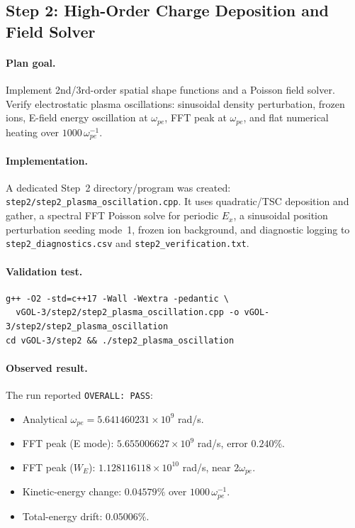\documentclass[11pt,a4paper]{article}
\begin{document}
\subsection{Step 2: High-Order Charge Deposition and Field Solver}

\paragraph{Plan goal.}
Implement 2nd/3rd-order spatial shape functions and a Poisson field solver. Verify electrostatic plasma oscillations: sinusoidal density perturbation, frozen ions, E-field energy oscillation at $\omega_{pe}$, FFT peak at $\omega_{pe}$, and flat numerical heating over $1000\,\omega_{pe}^{-1}$.

\paragraph{Implementation.}
A dedicated Step~2 directory/program was created: \texttt{step2/step2\_plasma\_oscillation.cpp}. It uses quadratic/TSC deposition and gather, a spectral FFT Poisson solve for periodic $E_x$, a sinusoidal position perturbation seeding mode~1, frozen ion background, and diagnostic logging to \texttt{step2\_diagnostics.csv} and \texttt{step2\_verification.txt}.

\paragraph{Validation test.}
\begin{lstlisting}
g++ -O2 -std=c++17 -Wall -Wextra -pedantic \
  vGOL-3/step2/step2_plasma_oscillation.cpp -o vGOL-3/step2/step2_plasma_oscillation
cd vGOL-3/step2 && ./step2_plasma_oscillation
\end{lstlisting}

\paragraph{Observed result.}
The run reported \texttt{OVERALL: PASS}:
\begin{itemize}[leftmargin=*]
  \item Analytical $\omega_{pe}=5.641460231\times10^9$ rad/s.
  \item FFT peak (E mode): $5.655006627\times10^9$ rad/s, error $0.240\%$.
  \item FFT peak ($W_E$): $1.128116118\times10^{10}$ rad/s, near $2\omega_{pe}$.
  \item Kinetic-energy change: $0.04579\%$ over $1000\,\omega_{pe}^{-1}$.
  \item Total-energy drift: $0.05006\%$.
\end{itemize}
\end{document}
